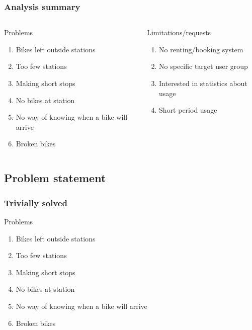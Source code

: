 \begin{frame}
\frametitle{Analysis summary}
\begin{columns}
\begin{column}{.5\textwidth}
\begin{block}{Problems}
\begin{enumerate}
\item Bikes left outside stations
\item Too few stations
\item Making short stops
\item No bikes at station
\item No way of knowing when a bike will arrive
\item Broken bikes
\end{enumerate}
\end{block}
\end{column}
\begin{column}{.5\textwidth}
\begin{block}{Limitations/requests}
\begin{enumerate}
\item No renting/booking system
\item No specific target user group
\item Interested in statistics about usage
\item Short period usage
\end{enumerate}
\end{block}
\end{column}
\end{columns}
\end{frame}

\subsection{Problem statement}

\begin{frame}
\frametitle{Trivially solved}
\begin{block}{Problems}
\begin{enumerate}
\item<1> Bikes left outside stations
\item<1> Too few stations
\item<1> Making short stops
\item<1> No bikes at station
\item<2> No way of knowing when a bike will arrive
\item<1> Broken bikes
\end{enumerate}
\end{block}
\end{frame}

